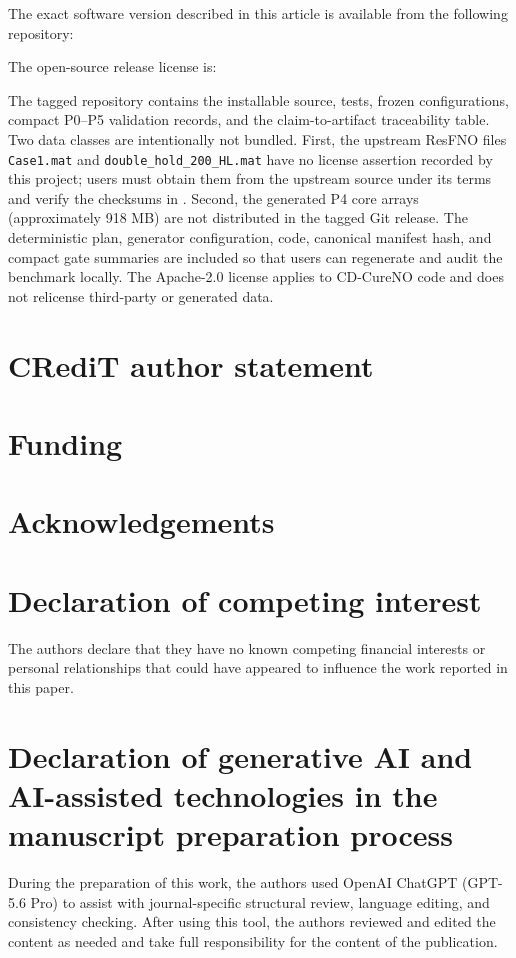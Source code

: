 \documentclass[preprint,12pt]{elsarticle}
\newcommand{\code}[1]{\texttt{#1}}
\begin{document}
The exact software version described in this article is available from the
following repository:

\CodeURLText

The open-source release license is:

\CodeLicenseText

The tagged repository contains the installable source, tests, frozen
configurations, compact P0--P5 validation records, and the claim-to-artifact
traceability table. Two data classes are intentionally not bundled. First,
the upstream ResFNO files \code{Case1.mat} and
\code{double\_hold\_200\_HL.mat} have no license assertion recorded by this
project; users must obtain them from the upstream source under its terms and
verify the checksums in . Second, the generated P4
core arrays (approximately 918 MB) are not distributed in the tagged Git
release. The deterministic plan, generator configuration, code, canonical
manifest hash, and compact gate summaries are included so that users can
regenerate and audit the benchmark locally. The Apache-2.0 license applies to
CD-CureNO code and does not relicense third-party or generated data.

\section*{CRediT author statement}
\CreditText

\section*{Funding}
\FundingText

\section*{Acknowledgements}
\AcknowledgementText

\section*{Declaration of competing interest}
The authors declare that they have no known competing financial interests or
personal relationships that could have appeared to influence the work reported
in this paper.

\section*{Declaration of generative AI and AI-assisted technologies in the manuscript preparation process}
During the preparation of this work, the authors used OpenAI ChatGPT
(GPT-5.6 Pro) to assist with journal-specific structural review, language
editing, and consistency checking. After using this tool, the authors reviewed
and edited the content as needed and take full responsibility for the content
of the publication.



\end{document}

